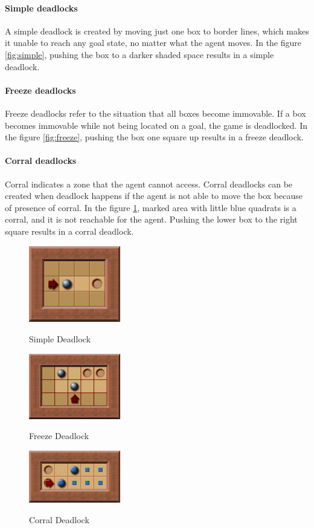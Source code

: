 \documentclass{article}
\begin{document}
\paragraph{Simple deadlocks}
A simple deadlock is created by moving just one box to border lines, which makes it unable to reach any goal state, no matter what the agent moves. In the figure \ref{fig:simple}, pushing the box to a darker shaded space results in a simple deadlock.

\paragraph{Freeze deadlocks}
Freeze deadlocks refer to the situation that all boxes become immovable. If a box becomes immovable while not being located on a goal, the game is deadlocked. In the figure \ref{fig:freeze}, pushing the box one square up results in a freeze deadlock.

\paragraph{Corral deadlocks}
Corral indicates a zone that the agent cannot access. Corral deadlocks can be created when deadlock happens if the agent is not able to move the box because of presence of corral. In the figure \ref{fig:corral}, marked area with little blue quadrats is a corral, and it is not reachable for the agent. Pushing the lower box to the right square results in a corral deadlock.

\begin{figure}
\centering
\begin{minipage}[b]{4cm}
\includegraphics[width=4cm]{SimpleDeadlockExample.png}
\caption{Simple Deadlock}
\label{fig:simple}
\end{minipage}
\begin{minipage}[b]{4cm}
\includegraphics[width=4cm]{FreezeDeadlockExample.png}
\label{fig:freeze}
\caption{Freeze Deadlock}
\end{minipage}
\begin{minipage}[b]{4cm}
\includegraphics[width=4cm]{CorralDeadlockExample.png}
\label{fig:corral}
\caption{Corral Deadlock}
\end{minipage}
\end{figure}
\end{document}
